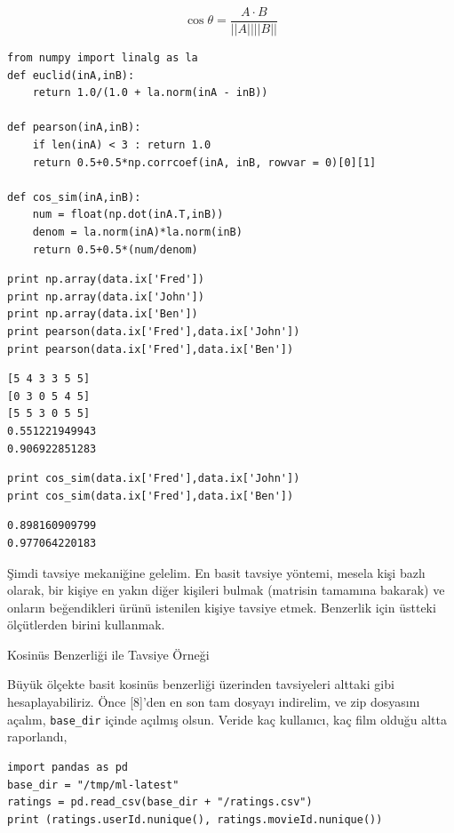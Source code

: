 \documentclass[12pt,fleqn]{article}\usepackage{../../common}
\begin{document}
$$
\cos\theta = \frac{A \cdot B}{||A||||B||}
$$

\begin{verbatim}
from numpy import linalg as la
def euclid(inA,inB):
    return 1.0/(1.0 + la.norm(inA - inB))

def pearson(inA,inB):
    if len(inA) < 3 : return 1.0
    return 0.5+0.5*np.corrcoef(inA, inB, rowvar = 0)[0][1]

def cos_sim(inA,inB):
    num = float(np.dot(inA.T,inB))
    denom = la.norm(inA)*la.norm(inB)
    return 0.5+0.5*(num/denom)
\end{verbatim}

\begin{verbatim}
print np.array(data.ix['Fred'])
print np.array(data.ix['John'])
print np.array(data.ix['Ben'])
print pearson(data.ix['Fred'],data.ix['John'])
print pearson(data.ix['Fred'],data.ix['Ben'])
\end{verbatim}

\begin{verbatim}
[5 4 3 3 5 5]
[0 3 0 5 4 5]
[5 5 3 0 5 5]
0.551221949943
0.906922851283
\end{verbatim}

\begin{verbatim}
print cos_sim(data.ix['Fred'],data.ix['John'])
print cos_sim(data.ix['Fred'],data.ix['Ben'])
\end{verbatim}

\begin{verbatim}
0.898160909799
0.977064220183
\end{verbatim}

Şimdi tavsiye mekaniğine gelelim. En basit tavsiye yöntemi, mesela
kişi bazlı olarak, bir kişiye en yakın diğer kişileri bulmak (matrisin
tamamına bakarak) ve onların beğendikleri ürünü istenilen kişiye
tavsiye etmek. Benzerlik için üstteki ölçütlerden birini kullanmak.


Kosinüs Benzerliği ile Tavsiye Örneği

Büyük ölçekte basit kosinüs benzerliği üzerinden tavsiyeleri alttaki gibi
hesaplayabiliriz. Önce [8]'den en son tam dosyayı indirelim, ve zip dosyasını
açalım, \verb!base_dir! içinde açılmış olsun. Veride kaç kullanıcı, kaç film
olduğu altta raporlandı,

\begin{verbatim}
import pandas as pd
base_dir = "/tmp/ml-latest"
ratings = pd.read_csv(base_dir + "/ratings.csv")
print (ratings.userId.nunique(), ratings.movieId.nunique())
\end{verbatim}
\end{document}
